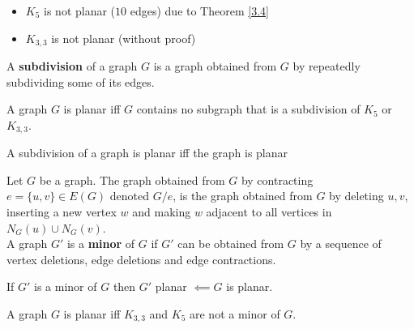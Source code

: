 \begin{example}\label{3.7}
    \hfill\begin{itemize}
        \item $K_5$ is not planar ($10$ edges) due to Theorem \ref{3.4}
        \item $K_{3,3}$ is not planar (without proof)
    \end{itemize}
\end{example}
\vspace{0.5cm}
\begin{definition}\label{3.8}
    A \textbf{subdivision} of a graph $G$ is a graph obtained from $G$ by repeatedly subdividing some of its edges.
\end{definition}
\vspace{0.5cm}
\begin{theorem}\label{3.9}
    A graph $G$ is planar iff $G$ contains no subgraph that is a subdivision of $K_5$ or $K_{3,3}$.
\end{theorem}
\begin{remark}\label{3.10}
    A subdivision of a graph is planar iff the graph is planar
\end{remark}
\vspace{0.5cm}
\begin{definition}\label{3.11}
    Let $G$ be a graph. The graph obtained from $G$ by contracting $e=\{u,v\}\in E(G)$ denoted $G/e$, is the graph obtained from $G$ by deleting $u,v$, inserting a new vertex $w$ and making $w$ adjacent to all vertices in $N_G(u)\cup N_G(v)$.\\
    A graph $G'$ is a \textbf{minor} of $G$ if $G'$ can be obtained from $G$ by a sequence of vertex deletions, edge deletions and edge contractions.
\end{definition}
\begin{remark}\label{3.12}
    If $G'$ is a minor of $G$ then $G'$ planar $\impliedby G$ is planar.
\end{remark}
\vspace{0.5cm}
\begin{theorem}\label{3.13}
    A graph $G$ is planar iff $K_{3,3}$ and $K_5$ are not a minor of $G$.
\end{theorem}